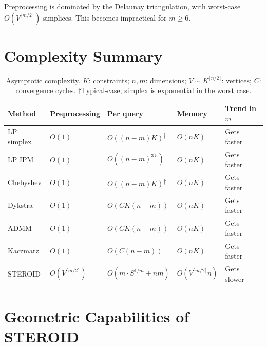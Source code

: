 \documentclass[review,onefignum,onetabnum]{./SIAM_template/siamart171218}
\begin{document}
Preprocessing is dominated by the Delaunay triangulation, with worst-case
$O(V^{\lceil m/2 \rceil})$ simplices.  This becomes impractical for $m \geq 6$.

\section{Complexity Summary}
\label{sec:complexity}

\begin{table}[h]
	\caption{Asymptotic complexity.  $K$: constraints; $n,m$: dimensions;
		$V \sim K^{\lfloor n/2 \rfloor}$: vertices; $C$: convergence cycles.
		$\dagger$Typical-case; simplex is exponential in the worst case.}
	\label{tab:complexity}
	\centering
	\begin{tabular}{lllll}
		\toprule
		Method     & Preprocessing              & Per query                                 & Memory                      & Trend in $m$ \\
		\midrule
		LP simplex & $O(1)$                     & $O((n{-}m) K)$\textsuperscript{$\dagger$} & $O(nK)$                     & Gets faster  \\
		LP IPM     & $O(1)$                     & $O((n{-}m)^{3.5})$                        & $O(nK)$                     & Gets faster  \\
		Chebyshev  & $O(1)$                     & $O((n{-}m) K)$\textsuperscript{$\dagger$} & $O(nK)$                     & Gets faster  \\
		Dykstra    & $O(1)$                     & $O(C K(n{-}m))$                           & $O(nK)$                     & Gets faster  \\
		ADMM       & $O(1)$                     & $O(C K(n{-}m))$                           & $O(nK)$                     & Gets faster  \\
		Kaczmarz   & $O(1)$                     & $O(C(n{-}m))$                             & $O(nK)$                     & Gets faster  \\
		STEROID    & $O(V^{\lceil m/2 \rceil})$ & $O(m \cdot S^{1/m} + nm)$                 & $O(V^{\lceil m/2\rceil} n)$ & Gets slower  \\
		\bottomrule
	\end{tabular}
\end{table}

\section{Geometric Capabilities of STEROID}
\label{sec:geometric}
\end{document}
